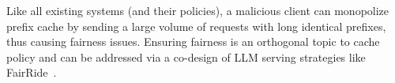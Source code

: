 Like all existing systems (and their policies),
a malicious client can monopolize prefix cache by sending a large volume of requests with long identical prefixes,
thus causing fairness issues.
Ensuring fairness is an orthogonal topic to cache policy
and can be addressed via a co-design of LLM serving strategies like FairRide~\cite{DBLP:conf/nsdi/PuLZGS16,DBLP:conf/osdi/0007CLZ0ZGS24}.